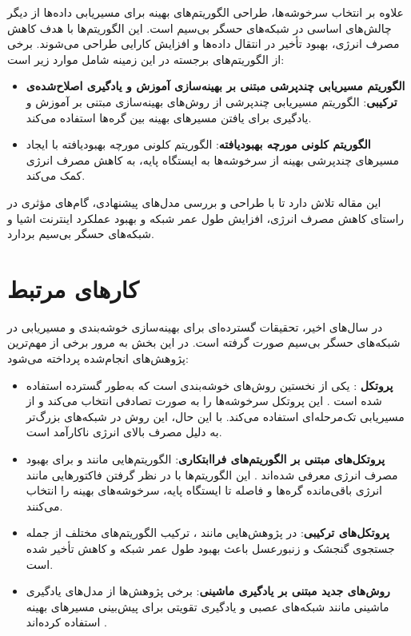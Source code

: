 \documentclass[12pt, onecolumn, a4paper]{article}
\begin{document}
	علاوه بر انتخاب سرخوشه‌ها، طراحی الگوریتم‌های بهینه برای مسیریابی داده‌ها از دیگر چالش‌های اساسی در شبکه‌های حسگر بی‌سیم است. این الگوریتم‌ها با هدف کاهش مصرف انرژی، بهبود تأخیر در انتقال داده‌ها و افزایش کارایی طراحی می‌شوند. برخی از الگوریتم‌های برجسته در این زمینه شامل موارد زیر است:
	
	\begin{itemize}
		\item \textbf{الگوریتم مسیریابی چندپرشی مبتنی بر بهینه‌سازی آموزش و یادگیری اصلاح‌شده‌ی ترکیبی}: الگوریتم مسیریابی چندپرشی از روش‌های بهینه‌سازی مبتنی بر آموزش و یادگیری برای یافتن مسیرهای بهینه بین گره‌ها استفاده می‌کند.
		\item \textbf{الگوریتم کلونی مورچه بهبودیافته}: الگوریتم کلونی مورچه بهبودیافته با ایجاد مسیرهای چندپرشی بهینه از سرخوشه‌ها به ایستگاه پایه، به کاهش مصرف انرژی کمک می‌کند.
	\end{itemize}
	
	این مقاله تلاش دارد تا با طراحی و بررسی مدل‌های پیشنهادی، گام‌های مؤثری در راستای کاهش مصرف انرژی، افزایش طول عمر شبکه و بهبود عملکرد اینترنت اشیا و شبکه‌های حسگر بی‌سیم بردارد.
	
	
\section{کارهای مرتبط}

در سال‌های اخیر، تحقیقات گسترده‌ای برای بهینه‌سازی خوشه‌بندی و مسیریابی در شبکه‌های حسگر بی‌سیم صورت گرفته است. در این بخش به مرور برخی از مهم‌ترین پژوهش‌های انجام‌شده پرداخته می‌شود:

\begin{itemize}
	\item \textbf{پروتکل }: یکی از نخستین روش‌های خوشه‌بندی است که به‌طور گسترده استفاده شده است \cite{ref1, ref8}. این پروتکل سرخوشه‌ها را به صورت تصادفی انتخاب می‌کند و از مسیریابی تک‌مرحله‌ای استفاده می‌کند. با این حال، این روش در شبکه‌های بزرگ‌تر به دلیل مصرف بالای انرژی ناکارآمد است.
	
	\item \textbf{پروتکل‌های مبتنی بر الگوریتم‌های فراابتکاری}: الگوریتم‌هایی مانند  و  برای بهبود مصرف انرژی معرفی شده‌اند \cite{ref7, ref9}. این الگوریتم‌ها با در نظر گرفتن فاکتورهایی مانند انرژی باقی‌مانده گره‌ها و فاصله تا ایستگاه پایه، سرخوشه‌های بهینه را انتخاب می‌کنند.
	
	\item \textbf{پروتکل‌های ترکیبی}: در پژوهش‌هایی مانند \cite{ref8, ref10}، ترکیب الگوریتم‌های مختلف از جمله جستجوی گنجشک و زنبورعسل باعث بهبود طول عمر شبکه و کاهش تأخیر شده است.
	
	\item \textbf{روش‌های جدید مبتنی بر یادگیری ماشینی}: برخی پژوهش‌ها از مدل‌های یادگیری ماشینی مانند شبکه‌های عصبی و یادگیری تقویتی برای پیش‌بینی مسیرهای بهینه استفاده کرده‌اند \cite{ref11, ref12}.
\end{itemize}
\end{document}
